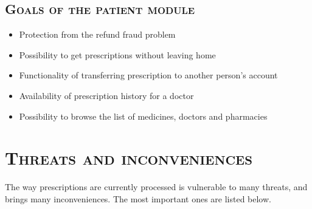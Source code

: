 \documentclass[12pt,titlepage]{article}
\begin{document}
\subsection{\textsc{Goals of the patient module}}
\begin{itemize}
\item Protection from the refund fraud problem
\item Possibility to get prescriptions without leaving home
\item Functionality of transferring prescription to another person's account
\item Availability of prescription history for a doctor
\item Possibility to browse the list of medicines, doctors and pharmacies
\end{itemize}

\newpage

\section{\textsc{Threats and inconveniences}}
The way prescriptions are currently processed is vulnerable to many threats, and brings many inconveniences. 
The most important ones are listed below.
\end{document}

